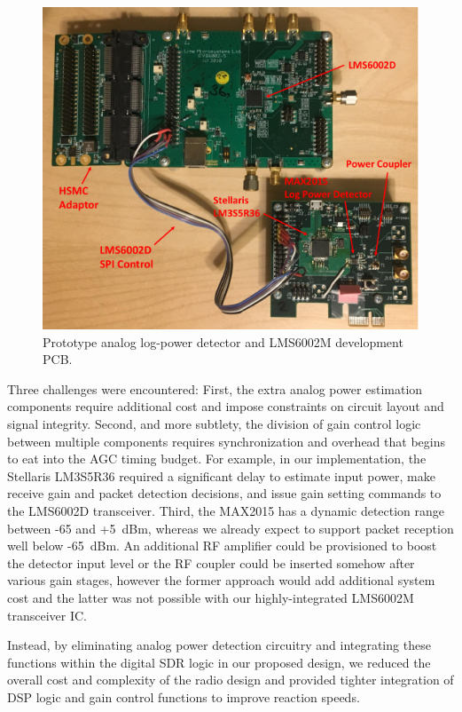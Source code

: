 \begin{figure}[ht] %
\centering
\includegraphics[width=0.9\linewidth]{./figs/agc/agc_dev_board}
\caption{Prototype analog log-power detector and LMS6002M development PCB.}
\label{fig_pwr_detection_proto}
\end{figure}

Three challenges were encountered:
	First, the extra analog power estimation components require additional cost and impose constraints on circuit layout and signal integrity.
	Second, and more subtlety, the division of gain control logic between multiple components requires synchronization and overhead that begins to eat into the \ac{AGC} timing budget.
For example, in our implementation, the Stellaris LM3S5R36 required a significant delay to estimate input power, make receive gain and packet detection decisions, and issue gain setting commands to the LMS6002D transceiver.
	Third, the MAX2015 has a dynamic detection range between -65 and +5~dBm, whereas we already expect to support packet reception well below -65~dBm.
	An additional RF amplifier could be provisioned to boost the detector input level or the RF coupler could be inserted somehow after various gain stages, however the former approach would add additional system cost and the latter was not possible with our highly-integrated LMS6002M transceiver IC.

	Instead, by eliminating analog power detection circuitry and integrating these functions within the digital \ac{SDR} logic in our proposed design, we reduced the overall cost and complexity of the radio design and provided tighter integration of \ac{DSP} logic and gain control functions to improve reaction speeds.
	
